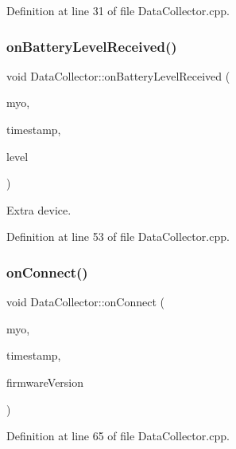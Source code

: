 Definition at line 31 of file Data\+Collector.\+cpp.

\mbox{\label{class_data_collector_a56a6c61925d54439459fc1599f76c601}} 
\subsubsection{\texorpdfstring{on\+Battery\+Level\+Received()}{onBatteryLevelReceived()}}
{\footnotesize\ttfamily void Data\+Collector\+::on\+Battery\+Level\+Received (\begin{DoxyParamCaption}\item[{myo\+::\+Myo $\ast$}]{myo,  }\item[{uint64\+\_\+t}]{timestamp,  }\item[{uint8\+\_\+t}]{level }\end{DoxyParamCaption})}



Extra device. 



Definition at line 53 of file Data\+Collector.\+cpp.

\mbox{\label{class_data_collector_a8e6ee72005537474eb45f2a9310fa540}} 
\subsubsection{\texorpdfstring{on\+Connect()}{onConnect()}}
{\footnotesize\ttfamily void Data\+Collector\+::on\+Connect (\begin{DoxyParamCaption}\item[{myo\+::\+Myo $\ast$}]{myo,  }\item[{uint64\+\_\+t}]{timestamp,  }\item[{myo\+::\+Firmware\+Version}]{firmware\+Version }\end{DoxyParamCaption})}



Definition at line 65 of file Data\+Collector.\+cpp.

\mbox{\label{class_data_collector_a89d1d780cdf635c607707f90b0665d50}} 
